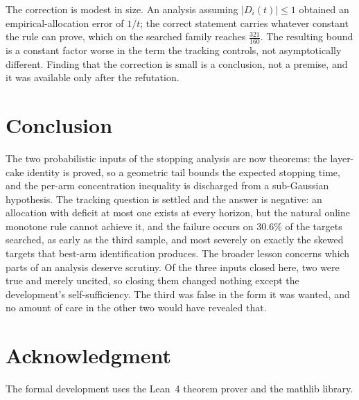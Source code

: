 \documentclass[conference]{IEEEtran}
\theoremstyle{definition}
\begin{document}
The correction is modest in size. An analysis assuming $|D_{i}(t)|\le1$ obtained an
empirical-allocation error of $1/t$; the correct statement carries whatever constant the rule
can prove, which on the searched family reaches $\tfrac{321}{160}$. The resulting bound is a constant
factor worse in the term the tracking controls, not asymptotically different. Finding that the
correction is small is a conclusion, not a premise, and it was available only after the
refutation.

\section{Conclusion}

The two probabilistic inputs of the stopping analysis are now theorems: the layer-cake identity
is proved, so a geometric tail bounds the expected stopping time, and the per-arm concentration
inequality is discharged from a sub-Gaussian hypothesis. The tracking question is settled and
the answer is negative: an allocation with deficit at most one exists at every horizon, but the
natural online monotone rule cannot achieve it, and the failure occurs on $30.6\%$ of
the targets searched, as early as the third sample, and most severely on exactly the skewed
targets that best-arm identification produces. The broader lesson concerns which parts of an
analysis deserve scrutiny. Of the three inputs closed here, two were true and merely uncited,
so closing them changed nothing except the development's self-sufficiency. The third was false
in the form it was wanted, and no amount of care in the other two would have revealed that.

\section*{Acknowledgment}

The formal development uses the Lean~4 theorem prover and the mathlib library.
\end{document}

